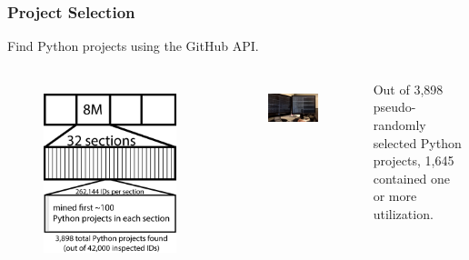 

\begin{frame}
\frametitle{Project Selection}
\begin{center}
Find Python projects using the GitHub API.
\end{center}
\begin{columns}[t]
\begin{figure}[ht]
  \includegraphics[scale=0.16]{../nontex/illustrations/32Divided.eps}
  \label{fig:32Divided}
\end{figure}
\begin{figure}[ht]
  \includegraphics[width=\linewidth]{../nontex/smallScrapersPNG/smallScrapers-112}
    \label{fig:scraper}
\end{figure}
Out of 3,898 pseudo-randomly selected Python projects, 1,645 contained one or more utilization.
\end{columns}
\end{frame}
